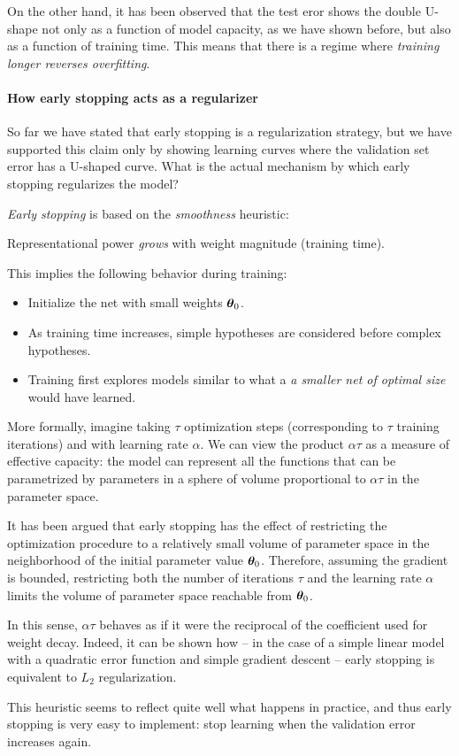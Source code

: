On the other hand, it has been observed that the test eror shows the double U-shape not only as a function of model capacity, as we have shown before, but also as a function of training time.
This means that there is a regime where \emph{training longer reverses overfitting}.

\paragraph{How early stopping acts as a regularizer}
So far we have stated that early stopping is a regularization strategy, but we have supported this claim only by showing learning curves where the validation set error has a U-shaped curve. What is the actual mechanism by which early stopping regularizes the model?

\emph{Early stopping} is based on the \emph{smoothness} heuristic:
\begin{center}
    Representational power \emph{grows} with weight magnitude (training time).
\end{center}
This implies the following behavior during training:
\begin{itemize}
    \item Initialize the net with small weights $\vb*{\theta}_0$.
    \item As training time increases, simple hypotheses are considered before complex hypotheses.
    \item Training first explores models similar to what a \emph{a smaller net of optimal size} would have learned.
\end{itemize}

More formally, imagine taking $\tau$ optimization steps (corresponding to $\tau$ training iterations) and with learning rate $\alpha$. We can view the product $\alpha \tau$ as a measure of effective capacity: the model can represent all the functions that can be parametrized by parameters in a sphere of volume proportional to $\alpha \tau$ in the parameter space. 

It has been argued that early stopping has the effect of restricting the optimization procedure to a relatively small volume of parameter space in the neighborhood of the initial parameter value $\vb*{\theta}_0$. Therefore, assuming the gradient is bounded, restricting both the number of iterations $\tau$ and the learning rate $\alpha$ limits the volume of parameter space reachable from $\vb*{\theta}_0$. 

In this sense, $\alpha \tau$ behaves as if it were the reciprocal of the coefficient used for weight decay. Indeed, it can be shown how -- in the case of a simple linear model with a quadratic error function and simple gradient descent -- early stopping is equivalent to $L_2$ regularization.


This heuristic seems to reflect quite well what happens in practice, and thus early stopping is very easy to implement: stop learning when the validation error increases again.
